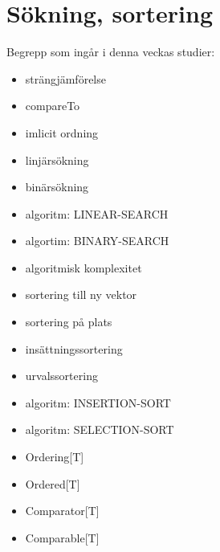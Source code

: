 \chapter{Sökning, sortering}\label{chapter:W10}
Begrepp som ingår i denna veckas studier:
\begin{itemize}[noitemsep,label={$\square$},leftmargin=*]
\item strängjämförelse
\item compareTo
\item imlicit ordning
\item linjärsökning
\item binärsökning
\item algoritm: LINEAR-SEARCH
\item algortim: BINARY-SEARCH
\item algoritmisk komplexitet
\item sortering till ny vektor
\item sortering på plats
\item insättningssortering
\item urvalssortering
\item algoritm: INSERTION-SORT
\item algoritm: SELECTION-SORT
\item Ordering[T]
\item Ordered[T]
\item Comparator[T]
\item Comparable[T]\end{itemize}
